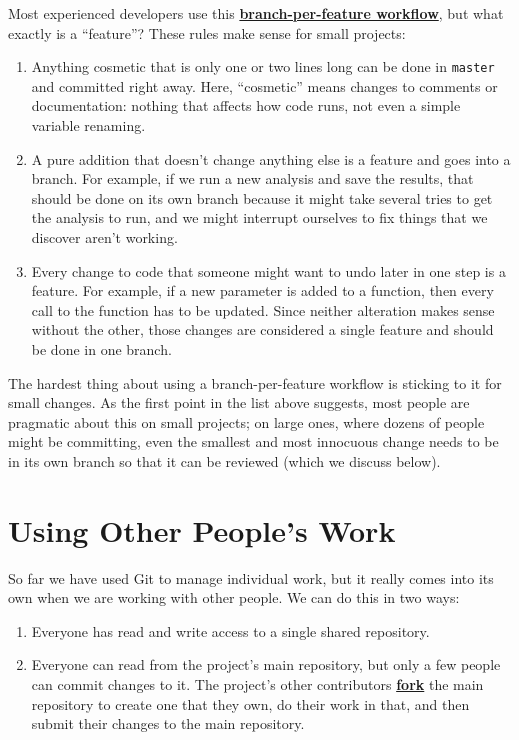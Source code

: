 \documentclass[
]{krantz}
\newcommand{\gref}[2]{\hyperlink{#2}{\textbf{#1}}}
\begin{document}
Most experienced developers use this
\gref{branch-per-feature workflow}{branch\_per\_feature\_workflow},
but what exactly is a ``feature''?
These rules make sense for small projects:

\begin{enumerate}
\def\labelenumi{\arabic{enumi}.}
\item
  Anything cosmetic that is only one or two lines long
  can be done in \texttt{master} and committed right away.
  Here,
  ``cosmetic'' means changes to comments or documentation:
  nothing that affects how code runs, not even a simple variable renaming.
\item
  A pure addition that doesn't change anything else is a feature and goes into a branch.
  For example,
  if we run a new analysis and save the results,
  that should be done on its own branch
  because it might take several tries to get the analysis to run,
  and we might interrupt ourselves to fix things that we discover aren't working.
\item
  Every change to code that someone might want to undo later in one step is a feature.
  For example,
  if a new parameter is added to a function,
  then every call to the function has to be updated.
  Since neither alteration makes sense without the other,
  those changes are considered a single feature and should be done in one branch.
\end{enumerate}

The hardest thing about using a branch-per-feature workflow is sticking to it for small changes.
As the first point in the list above suggests,
most people are pragmatic about this on small projects;
on large ones,
where dozens of people might be committing,
even the smallest and most innocuous change needs to be in its own branch
so that it can be reviewed (which we discuss below).

\hypertarget{git-advanced-fork}{%
\section{Using Other People's Work}\label{git-advanced-fork}}

So far we have used Git to manage individual work,
but it really comes into its own when we are working with other people.
We can do this in two ways:

\begin{enumerate}
\def\labelenumi{\arabic{enumi}.}
\item
  Everyone has read and write access to a single shared repository.
\item
  Everyone can read from the project's main repository,
  but only a few people can commit changes to it.
  The project's other contributors \gref{fork}{git\_fork} the main repository
  to create one that they own,
  do their work in that,
  and then submit their changes to the main repository.
\end{enumerate}
\end{document}
